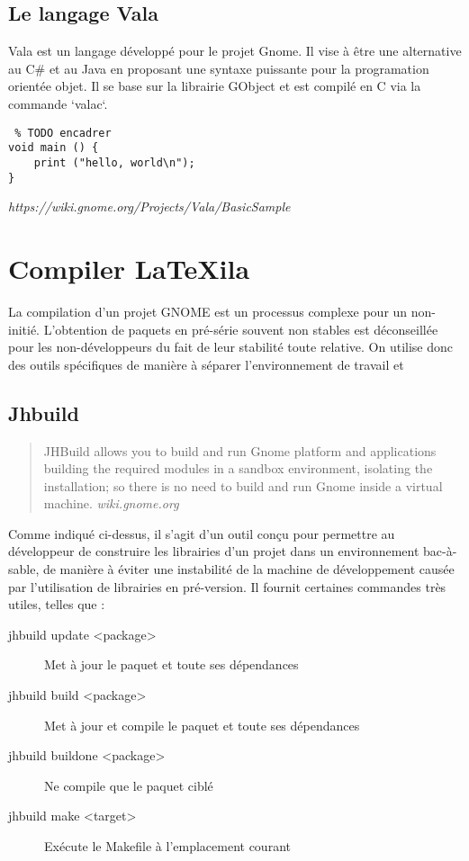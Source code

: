 \documentclass[a4paper,11pt]{report}
\begin{document}
\subsection{Le langage Vala}
\label{sss:vala}
Vala est un langage développé pour le projet Gnome. Il vise à être une alternative au C\# et au Java en proposant une syntaxe puissante pour la programation orientée objet.
Il se base sur la librairie GObject et est compilé en C via la commande `valac`.

\begin{lstlisting} % TODO encadrer
void main () {
    print ("hello, world\n");
}
\end{lstlisting}\textit{https://wiki.gnome.org/Projects/Vala/BasicSample}

\section{Compiler LaTeXila}
\label{cha:compiler}
La compilation d'un projet GNOME est un processus complexe pour un non-initié. L'obtention de paquets en pré-série souvent non stables est déconseillée pour les non-développeurs du fait de leur stabilité toute relative. On utilise donc des outils spécifiques de manière à séparer l'environnement de travail et 

\subsection{Jhbuild}
\label{sub:jhbuild}
\begin{quote}
  JHBuild allows you to build and run Gnome platform and applications building the required modules in a sandbox environment, isolating the installation; so there is no need to build and run Gnome inside a virtual machine. \textit{wiki.gnome.org}
\end{quote}
Comme indiqué ci-dessus, il s'agit d'un outil conçu pour permettre au développeur de construire les librairies d'un projet dans un environnement bac-à-sable, de manière à éviter une instabilité de la machine de développement causée par l'utilisation de librairies en pré-version. Il fournit certaines commandes très utiles, telles que :
\begin{description}
  \item[jhbuild update <package>] Met à jour le paquet et toute ses dépendances
  \item[jhbuild build <package>] Met à jour et compile le paquet et toute ses dépendances
  \item[jhbuild buildone <package>] Ne compile que le paquet ciblé
  \item[jhbuild make <target>] Exécute le Makefile à l'emplacement courant
\end{description}
\end{document}
